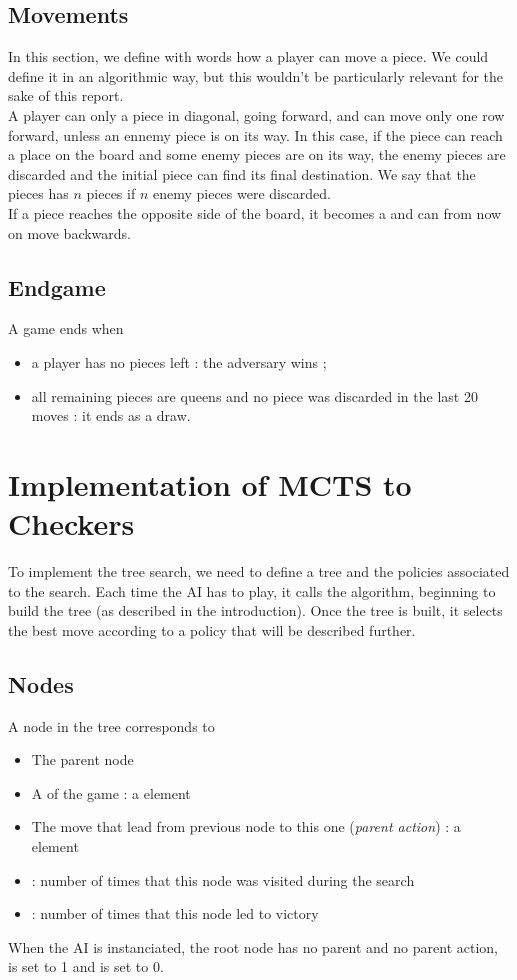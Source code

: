 \documentclass[11pt,a4paper]{article}
\begin{document}
\subsection{Movements}
In this section, we define with words how a player can move a piece. We could define it in an algorithmic way, but this wouldn't be particularly relevant for the sake of this report. \\

A player can only  a piece in diagonal, going forward, and can move only one row forward, unless an ennemy piece is on its way. In this case, if the piece can reach a place on the board and some enemy pieces are on its way, the enemy pieces are discarded and the initial piece can find its final destination. We say that the pieces has  $n$ pieces if $n$ enemy pieces were discarded. \\

If a piece reaches the opposite side of the board, it becomes a  and can from now on move backwards.
\subsection{Endgame}
A game ends when
\begin{itemize}
    \item a player has no pieces left : the adversary wins ;
    \item all remaining pieces are queens and no piece was discarded in the last 20 moves : it ends as a draw.
\end{itemize}


\section{Implementation of MCTS to Checkers}
To implement the tree search, we need to define a tree and the policies associated to the search. Each time the AI has to play, it calls the algorithm, beginning to build the tree (as described in the introduction). Once the tree is built, it selects the best move according to a policy that will be described further.

\subsection{Nodes}
A node in the tree corresponds to
\begin{itemize}
    \item The parent node
    \item A  of the game : a  element
    \item The move that lead from previous node to this one (\textit{parent action}) : a  element
    \item {} : number of times that this node was visited during the search
    \item {} : number of times that this node led to victory
\end{itemize}
When the AI is instanciated, the root node has no parent and no parent action,  is set to 1 and  is set to 0. \\
\end{document}
